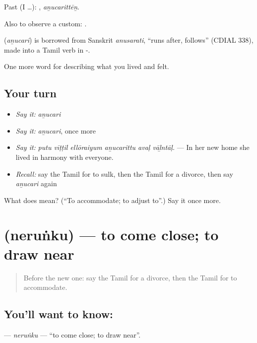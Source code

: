 Past (I …): , \emph{aṉucarittēṉ}.

Also to observe a custom:  .

\begin{cousinweb}
\textbf{} (\emph{aṉucari}) is borrowed from Sanskrit \emph{anusarati}, \textquotedblleft{}runs after, follows\textquotedblright{} (CDIAL 338), made into a Tamil verb in -.
\end{cousinweb}

\begin{grammarlens}[title={What you've built}]
One more word for describing what you lived and felt.
\end{grammarlens}

\subsection*{Your turn}
\begin{itemize}
\raggedright
  \item \emph{Say it:} \emph{aṉucari}
  \item \emph{Say it:} \emph{aṉucari}, once more
  \item \emph{Say it:} \emph{putu vīṭṭil ellōraiyum aṉucarittu avaḷ vāḻntāḷ.} — In her new home she lived in harmony with everyone.
  \item \emph{Recall:} say the Tamil for to sulk, then the Tamil for a divorce, then say \emph{aṉucari} again
\end{itemize}

\begin{tcolorbox}[breakable,colback=teal!4,colframe=teal!35!black,title={Before you move on}]
What does  mean? (\textquotedblleft{}To accommodate; to adjust to\textquotedblright{}.) Say it once more.
\end{tcolorbox}
\section[\texorpdfstring{\ta{நெருங்கு} (neruṅku)}{நெருங்கு (neruṅku)}]{ (neruṅku) — to come close; to draw near}

\label{lesson:TA-C502-nerunku}



\begin{quote}
Before the new one: say the Tamil for a divorce, then the Tamil for to accommodate.
\end{quote}

\subsection*{You'll want to know: }
\textbf{} — \emph{neruṅku} — \textquotedblleft{}to come close; to draw near\textquotedblright{}.

